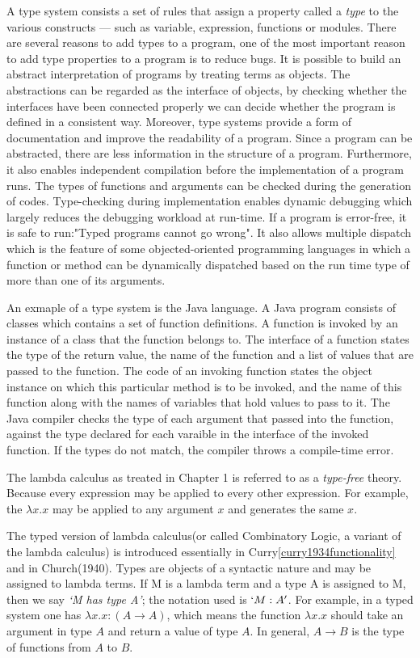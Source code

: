 \documentclass[a4paper,11pt,twoside]{report}
\begin{document}
A type system consists a set of rules that assign a property called a \textit{type} to the various constructs --- such as variable, expression, functions or modules. There are several reasons to add types to a program, one of the most important reason to add type properties to a program is to reduce bugs. It is possible to build an abstract interpretation of programs by treating terms as objects. The abstractions can be regarded as the interface of objects, by checking whether the interfaces have been connected properly we can decide whether the program is defined in a consistent way. Moreover, type systems provide a form of documentation and improve the readability of a program. Since a program can be abstracted, there are less information in the structure of a program. Furthermore, it also enables independent compilation before the implementation of a program runs. The types of functions and arguments can be checked during the generation of codes. Type-checking during implementation enables dynamic  debugging which largely reduces the debugging workload at run-time. If a program is error-free, it is safe to run:"Typed programs cannot go wrong". It also allows multiple dispatch which is the feature of some objected-oriented programming languages in which a function or method can be dynamically dispatched based on the run time type of more than one of its arguments.
 
An exmaple of a type system is the Java language. A Java program consists of classes which contains a set of function definitions. A function is invoked by an instance of a class that the function belongs to. The interface of a function states the type of the return value, the name of the function and a list of values that are passed to the function. The code of an invoking function states the object instance on which this particular method is to be invoked, and the name of this function along with the names of variables that hold values to pass to it. The Java compiler checks the type of each argument that passed into the function, against the type declared for each varaible in the interface of the invoked function. If the types do not match, the compiler throws a compile-time error.

The lambda calculus as treated in Chapter 1 is referred to as a \textit{type-free} theory. Because every expression may be applied to every other expression. For example, the $\lambda x.x$ may be applied to any argument $x$ and generates the same $x$. 

The typed version of lambda calculus(or called Combinatory Logic, a variant of the lambda calculus) is introduced essentially in Curry\ref{curry1934functionality} and in Church(1940). Types are objects of a syntactic nature and may be assigned to lambda terms. If M is a lambda term and a type A is assigned to M, then we say \textit{`M has type A'}; the notation used is $`M:A'$. For example, in a typed system one has $\lambda x.x : (A \rightarrow A)$, which means the function $\lambda x.x$ should take an argument in type $A$ and return a value of type $A$. In general, $A \rightarrow B$ is the type of functions from $A$ to $B$.
\end{document}
